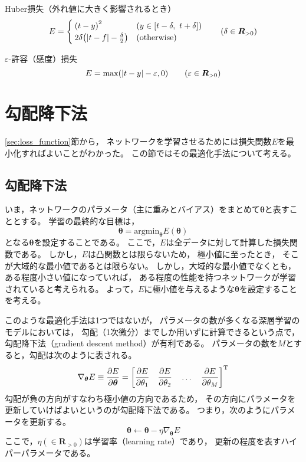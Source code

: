 \documentclass[class=jsarticle, crop=false, dvipdfmx, fleqn]{standalone}
\begin{document}
Huber損失（外れ値に大きく影響されるとき）
\begin{equation}
E =
	\begin{cases}
		\qty(t - y)^2 & (y \in \qty[t-\delta,\ t+\delta]) \\
		2\delta \qty(|t - f| - \frac{\delta}{2}) & (\mathrm{otherwise})
	\end{cases}
	\qquad \qty(\delta \in \bm{R}_{>0})
\end{equation}

$\varepsilon$-許容（感度）損失
\begin{equation}
E = \max(|t - y| - \varepsilon, 0) \qquad \qty(\varepsilon \in \bm{R}_{>0})
\end{equation}



\section{勾配降下法}
\label{sec:gradient_descent}

\ref{sec:loss_function}節から，
ネットワークを学習させるためには損失関数$E$を最小化すればよいことがわかった。
この節ではその最適化手法について考える。


\subsection{勾配降下法}

いま，ネットワークのパラメータ（主に重みとバイアス）をまとめて$\bm{\theta}$と表すこととする。
学習の最終的な目標は，
\begin{equation}
\bm{\theta} = \mathrm{argmin}_{\bm{\theta}} E(\bm{\theta})
\end{equation}
となる$\bm{\theta}$を設定することである。
ここで，$E$は全データに対して計算した損失関数である。
しかし，$E$は凸関数とは限らないため，
極小値に至ったとき，
そこが大域的な最小値であるとは限らない。
しかし，大域的な最小値でなくとも，
ある程度小さい値になっていれば，
ある程度の性能を持つネットワークが学習されていると考えられる。
よって，$E$に極小値を与えるような$\bm{\theta}$を設定することを考える。

このような最適化手法は1つではないが，
パラメータの数が多くなる深層学習のモデルにおいては，
勾配（1次微分）までしか用いずに計算できるという点で，
勾配降下法（gradient descent method）が有利である。
パラメータの数を$M$とすると，勾配は次のように表される。
\begin{equation}
\nabla_{\bm{\theta}} E \equiv \pdv{E}{\bm{\theta}} =
	\qty[
		\pdv{E}{\theta_1} \quad
		\pdv{E}{\theta_2} \quad
		\dots \quad
		\pdv{E}{\theta_M}
	]^\mathrm{T}
\end{equation}
勾配が負の方向がすなわち極小値の方向であるため，
その方向にパラメータを更新していけばよいというのが勾配降下法である。
つまり，次のようにパラメータを更新する。
\begin{equation}
\bm{\theta} \leftarrow \bm{\theta} - \eta \nabla_{\bm{\theta}} E
\label{eq:update_param}
\end{equation}
ここで，$\eta (\in \bm{R}_{>0})$は学習率（learning rate）であり，
更新の程度を表すハイパーパラメータである。
\end{document}
